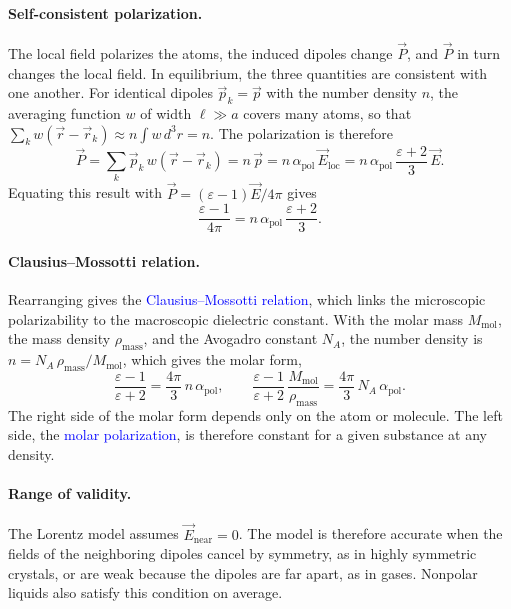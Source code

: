 \paragraph{Self-consistent polarization.}
The local field polarizes the atoms, the induced dipoles change $\vec P$, and $\vec P$ in turn changes the local field. In equilibrium, the three quantities are consistent with one another. For identical dipoles $\vec p_k = \vec p$ with the number density $n$, the averaging function $w$ of width $\ell \gg a$ covers many atoms, so that $\sum_k w(\vec r - \vec r_k) \approx n\int w\,d^3r = n$. The polarization is therefore
\begin{equation*}
    \vec P = \sum_k \vec p_k\,w(\vec r - \vec r_k) = n\,\vec p = n\,\alpha_{\text{pol}}\,\vec E_{\text{loc}} = n\,\alpha_{\text{pol}}\,\frac{\varepsilon + 2}{3}\,\vec E.
\end{equation*}
Equating this result with $\vec P = (\varepsilon - 1)\vec E/4\pi$ gives
\begin{equation*}
    \frac{\varepsilon - 1}{4\pi} = n\,\alpha_{\text{pol}}\,\frac{\varepsilon + 2}{3}.
\end{equation*}

\paragraph{Clausius--Mossotti relation.}
Rearranging gives the \textcolor{blue}{Clausius--Mossotti relation}, which links the microscopic polarizability to the macroscopic dielectric constant. With the molar mass $M_{\text{mol}}$, the mass density $\rho_{\text{mass}}$, and the Avogadro constant $N_A$, the number density is $n = N_A\,\rho_{\text{mass}}/M_{\text{mol}}$, which gives the molar form,
\begin{equation}
    \boxed{
    \frac{\varepsilon - 1}{\varepsilon + 2} = \frac{4\pi}{3}\,n\,\alpha_{\text{pol}},
    \qquad
    \frac{\varepsilon - 1}{\varepsilon + 2}\,\frac{M_{\text{mol}}}{\rho_{\text{mass}}} = \frac{4\pi}{3}\,N_A\,\alpha_{\text{pol}}.
    }
\end{equation}
The right side of the molar form depends only on the atom or molecule. The left side, the \textcolor{blue}{molar polarization}, is therefore constant for a given substance at any density.

\paragraph{Range of validity.}
The Lorentz model assumes $\vec E_{\text{near}} = 0$. The model is therefore accurate when the fields of the neighboring dipoles cancel by symmetry, as in highly symmetric crystals, or are weak because the dipoles are far apart, as in gases. Nonpolar liquids also satisfy this condition on average.

